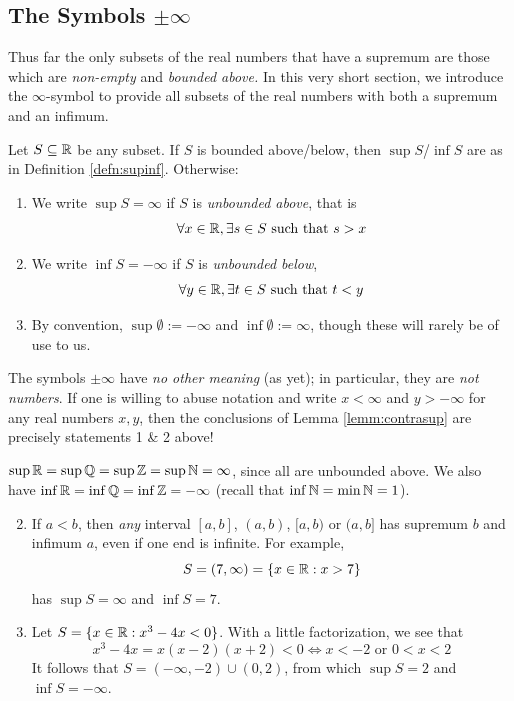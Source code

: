 \clearpage


\subsection[The Symbols +/- Infinity]{The Symbols $\pm\infty$}

Thus far the only subsets of the real numbers that have a supremum are those which are \emph{non-empty} and \emph{bounded above.} In this very short section, we introduce the $\infty$-symbol to provide all subsets of the real numbers with both a supremum and an infimum.

\begin{defn}{}{}
	Let $S\subseteq\mathbb{R}$ be any subset. If $S$ is bounded above/below, then $\sup S$/$\inf S$ are as in Definition \ref{defn:supinf}. Otherwise:
	\begin{enumerate}
	  \item We write $\sup S=\infty$ if $S$ is \emph{unbounded above}, that is
	  \[
	  	\forall x\in \mathbb{R}, \exists s\in S\text{ such that }s>x
	  \]
	  \item We write $\inf S=-\infty$ if $S$ is \emph{unbounded below},
	  \[
	  	\forall y\in \mathbb{R}, \exists t\in S\text{ such that }t<y
	  \]
	  \item By convention, $\sup\emptyset:=-\infty$ and $\inf\emptyset:=\infty$, though these will rarely be of use to us.
	\end{enumerate}
\end{defn}

The symbols $\pm\infty$ have \emph{no other meaning} (as yet); in particular, they are \emph{not numbers}. If one is willing to abuse notation and write $x<\infty$ and $y>-\infty$ for any real numbers $x,y$, then the conclusions of Lemma \ref{lemm:contrasup} are precisely statements 1 \& 2 above!


\begin{examples}{}{}
	\exstart $\sup\mathbb{R}=\sup\mathbb{Q}=\sup\mathbb{Z}=\sup\mathbb{N}=\infty$, since all are unbounded above. We also have $\inf\mathbb{R}=\inf\mathbb{Q}=\inf\mathbb{Z}=-\infty$ (recall that $\inf\mathbb{N}=\min\mathbb{N}=1$).
	\begin{enumerate}\setcounter{enumi}{1}
	  \item If $a<b$, then \emph{any} interval $[a,b]$, $(a,b)$, $[a,b)$ or $(a,b]$ has supremum $b$ and infimum $a$, even if one end is infinite. For example,
		\[
			S=(7,\infty)=\{x\in\mathbb{R}:x>7\}
		\]
		has $\sup S=\infty$ and $\inf S=7$.
		\item Let $S=\{x\in\mathbb{R}:x^3-4x<0\}$. With a little factorization, we see that
		\[
			x^3-4x=x(x-2)(x+2)<0\iff x<-2\text{ or }0<x<2
		\]
		It follows that $S=(-\infty,-2)\cup(0,2)$, from which $\sup S=2$ and $\inf S=-\infty$.  
	\end{enumerate}
\end{examples}


